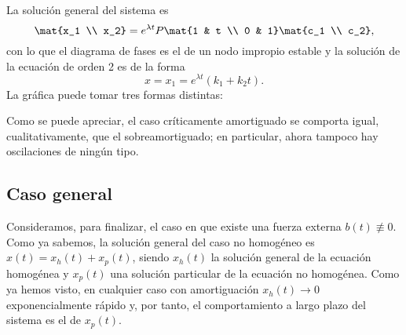\documentclass[../main.tex]{subfiles}
\begin{document}
\begin{itemize}
    La solución general del sistema es
    \[\mat{x_1 \\ x_2} = e^{\lambda t} P \mat{1 & t \\ 0 & 1} \mat{c_1 \\
        c_2},\]
    con lo que el diagrama de fases es el de un nodo impropio estable y la
    solución de la ecuación de orden 2 es de la forma
    \[x = x_1 = e^{\lambda t}(k_1 + k_2t).\]
    La gráfica puede tomar tres formas distintas:
    \begin{figure}[ht]
      \centering
      \begin{subfigure}{0.33\textwidth}
        \centering
      \end{subfigure}%
      \begin{subfigure}{0.33\textwidth}
        \centering
      \end{subfigure}%
      \begin{subfigure}{0.33\textwidth}
        \centering
      \end{subfigure}%
    \end{figure}

    Como se puede apreciar, el caso críticamente amortiguado se comporta igual,
    cualitativamente, que el sobreamortiguado; en particular, ahora tampoco hay
    oscilaciones de ningún tipo.
  \end{itemize}

  \subsection{Caso general}
  Consideramos, para finalizar, el caso en que existe una fuerza externa
  \(b(t) \not \equiv 0\). Como ya sabemos, la solución general del caso no
  homogéneo es \(x(t) = x_h(t) + x_p(t)\), siendo \(x_h(t)\) la solución general
  de la ecuación homogénea y \(x_p(t)\) una solución particular de la ecuación
  no homogénea. Como ya hemos visto, en cualquier caso con amortiguación
  \(x_h(t) \to 0\) exponencialmente rápido y, por tanto, el comportamiento a
  largo plazo del sistema es el de \(x_p(t)\).
\end{document}
